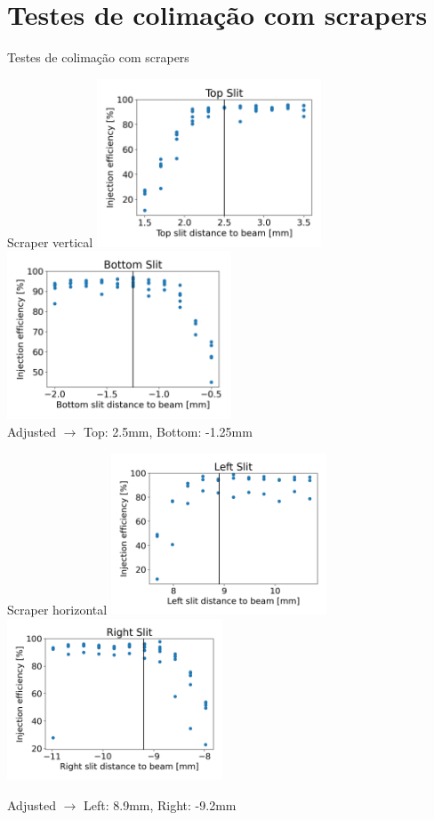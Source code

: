 \documentclass[1611]{beamer}					  %
\begin{document}
\section{Testes de colimação com scrapers}

\begin{frame}
    \Huge{Testes de colimação com scrapers}
\end{frame}

\begin{frame}{Scraper vertical}
    \centering
    \includegraphics[width=0.5\textwidth]{2024-04-19/figures/Top.png}
    \includegraphics[width=0.5\textwidth]{2024-04-19/figures/Bottom.png}
    \\
    \centering
     Adjusted $\to$ Top: 2.5mm, Bottom: -1.25mm
\end{frame}

\begin{frame}{Scraper horizontal}
    \centering
    \includegraphics[width=0.48\textwidth]{2024-04-19/figures/Left.png}
    \includegraphics[width=0.48\textwidth]{2024-04-19/figures/Right.png}

     Adjusted $\to$ Left: 8.9mm, Right: -9.2mm
\end{frame}
\end{document}
